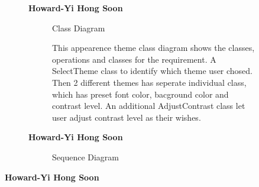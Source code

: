 \documentclass{article}
\begin{document}
		\newpage

		\begin{figure}[htbp]
			\textbf{Howard-Yi Hong Soon}
			\centering
			\begin{subfigure}{\textwidth}
				\resizebox{\textwidth}{!}{}
				\caption{Class Diagram}
			\end{subfigure}
			\begin{subfigure}{\textwidth}
				This appearence theme class diagram shows the classes, operations and classes for the requirement. A SelectTheme class to identify
				which theme user chosed. Then 2 different themes has seperate individual class, which has preset font color, bacground color and 
				contrast level. An additional AdjustContrast class let user adjust contrast level as their wishes.
			\end{subfigure}
		\end{figure}
		
		

		\begin{figure}[htbp]
			\textbf{Howard-Yi Hong Soon}
			\centering
			\begin{subfigure}{\textwidth}
				\scalebox{0.7}{}
				\caption{Sequence Diagram}
			\end{subfigure}
			\begin{subfigure}{\textwidth}
			\end{subfigure}
		\end{figure}
		

		\textbf{Howard-Yi Hong Soon}
\end{document}
